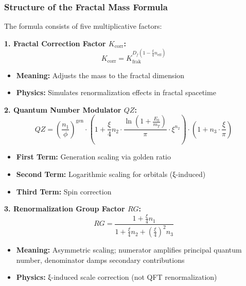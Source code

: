 	\subsubsection{Structure of the Fractal Mass Formula}
	
	The formula consists of five multiplicative factors:
	
	\textbf{1. Fractal Correction Factor $K_{\text{corr}}$:}
	\begin{equation}
		K_{\text{corr}} = K_{\text{frak}}^{D_f \left(1 - \frac{\xi}{4} n_{\text{eff}}\right)}
	\end{equation}
	\begin{itemize}
		\item \textbf{Meaning:} Adjusts the mass to the fractal dimension
		\item \textbf{Physics:} Simulates renormalization effects in fractal spacetime
	\end{itemize}
	
	\textbf{2. Quantum Number Modulator $QZ$:}
	\begin{equation}
		QZ = \left( \frac{n_1}{\phi} \right)^{\text{gen}} \cdot \left(1 + \frac{\xi}{4} n_2 \cdot \frac{\ln\left(1 + \frac{E_0}{m_T}\right)}{\pi} \cdot \xi^{n_2}\right) \cdot \left(1 + n_3 \cdot \frac{\xi}{\pi}\right)
	\end{equation}
	\begin{itemize}
		\item \textbf{First Term:} Generation scaling via golden ratio
		\item \textbf{Second Term:} Logarithmic scaling for orbitals (ξ-induced)
		\item \textbf{Third Term:} Spin correction
	\end{itemize}
	
	\textbf{3. Renormalization Group Factor $RG$:}
	\begin{equation}
		RG = \frac{1 + \frac{\xi}{4} n_1}{1 + \frac{\xi}{4} n_2 + \left(\frac{\xi}{4}\right)^2 n_3}
	\end{equation}
	\begin{itemize}
		\item \textbf{Meaning:} Asymmetric scaling; numerator amplifies principal quantum number, denominator damps secondary contributions
		\item \textbf{Physics:} ξ-induced scale correction (not QFT renormalization)
	\end{itemize}
	
